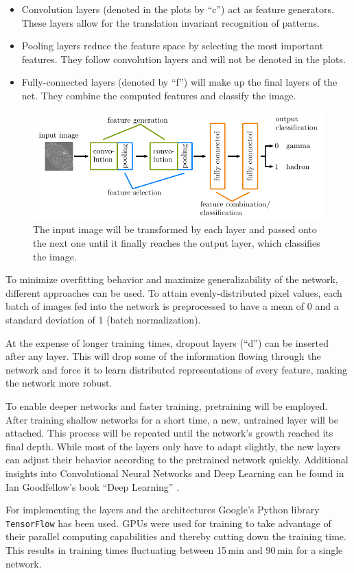 \begin{itemize}
\item Convolution layers (denoted in the plots by \enquote{c}) act as feature generators.
These layers allow for the translation invariant recognition of patterns.

\item Pooling layers reduce the feature space by selecting the most important features.
They follow convolution layers and will not be denoted in the plots.

\item Fully-connected layers (denoted by \enquote{f}) will make up the final layers of the net.
They combine the computed features and classify the image.
\end{itemize}

\begin{figure}
    \centering
    \includegraphics[scale=1]{Plots/CNN_Example.pdf}
    \caption{The input image will be transformed by each layer and passed onto the next one until it finally reaches the output layer, which classifies the image.}
    \label{fig:cnn_example}
\end{figure}

To minimize overfitting behavior and maximize generalizability of the network, different approaches can be used.
To attain evenly-distributed pixel values,
each batch of images fed into the network is preprocessed to have a mean of \num{0} and a standard deviation of \num{1} (batch normalization).

At the expense of longer training times, dropout layers (\enquote{d}) can be inserted after any layer.
This will drop some of the information flowing through the network
and force it to learn distributed representations of every feature, making the network more robust.

To enable deeper networks and faster training, pretraining will be employed.
After training shallow networks for a short time, a new, untrained layer will be attached.
This process will be repeated until the network's growth reached its final depth.
While most of the layers only have to adapt slightly,
the new layers can adjust their behavior according to the pretrained network quickly.
Additional insights into Convolutional Neural Networks and Deep Learning can be found in Ian Goodfellow's book \enquote{Deep Learning} \cite{deeplearning}.

For implementing the layers and the architectures Google's Python library \texttt{TensorFlow} \cite{tensorflow} has been used.
GPUs were used for training
to take advantage of their parallel computing capabilities and thereby cutting down the training time.
This results in training times fluctuating between \num{15}\,\si{\minute} and \num{90}\,\si{\minute} for a single network.
